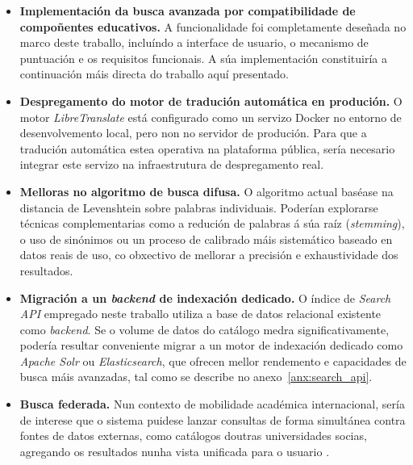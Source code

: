 \documentclass[%
    a4paper,               %
    twoside,               %
    10pt,                  %
]{article}                 %
\begin{document}
\begin{itemize}
    \item \textbf{Implementación da busca avanzada por compatibilidade de compoñentes educativos.} A funcionalidade foi completamente deseñada no marco deste traballo, incluíndo a interface de usuario, o mecanismo de puntuación e os requisitos funcionais. A súa implementación constituiría a continuación máis directa do traballo aquí presentado.

    \item \textbf{Despregamento do motor de tradución automática en produción.} O motor \textit{LibreTranslate} está configurado como un servizo Docker no entorno de desenvolvemento local, pero non no servidor de produción. Para que a tradución automática estea operativa na plataforma pública, sería necesario integrar este servizo na infraestrutura de despregamento real.

    \item \textbf{Melloras no algoritmo de busca difusa.} O algoritmo actual baséase na distancia de Levenshtein sobre palabras individuais. Poderían explorarse técnicas complementarias como a redución de palabras á súa raíz (\textit{stemming}), o uso de sinónimos ou un proceso de calibrado máis sistemático baseado en datos reais de uso, co obxectivo de mellorar a precisión e exhaustividade dos resultados.

    \item \textbf{Migración a un \textit{backend} de indexación dedicado.} O índice de \textit{Search API} empregado neste traballo utiliza a base de datos relacional existente como \textit{backend}. Se o volume de datos do catálogo medra significativamente, podería resultar conveniente migrar a un motor de indexación dedicado como \textit{Apache Solr} ou \textit{Elasticsearch}, que ofrecen mellor rendemento e capacidades de busca máis avanzadas, tal como se describe no anexo~\ref{anx:search_api}.

    \item \textbf{Busca federada.} Nun contexto de mobilidade académica internacional, sería de interese que o sistema puidese lanzar consultas de forma simultánea contra fontes de datos externas, como catálogos doutras universidades socias, agregando os resultados nunha vista unificada para o usuario \cite{shokouhi2011}.
\end{itemize}

{\small


}
\clearpage
\end{document}
